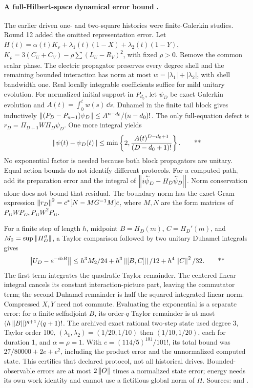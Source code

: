 \paragraph{A full-Hilbert-space dynamical error bound \workstar.}
The earlier driven one- and two-square histories were finite-Galerkin studies.
Round 12 added the omitted representation error.  Let
\(H(t)=\alpha(t)K_\rho+\lambda_1(t)(1-X)+\lambda_2(t)(1-Y)\),
\(K_\rho=3(C_U+C_V)-\rho\sum(L_U-R_V)^2\), with fixed \(\rho>0\).
Remove the common scalar phase.  The electric propagator preserves every
degree shell and the remaining bounded interaction has norm at most
\(w=|\lambda_1|+|\lambda_2|\), with shell bandwidth one.  Real locally
integrable coefficients suffice for mild unitary evolution.
For normalized initial support in \(P_{d_0}\), let \(\psi_D\) be exact
Galerkin evolution and \(A(t)=\int_0^tw(s)\,\dd s\).  Duhamel in the finite
tail block gives inductively
\(\left\lVert (P_D-P_{n-1})\psi_D\right\rVert\le A^{n-d_0}/(n-d_0)!\).
The only full-equation defect is
\(r_D=\Pi_{D+1}W\Pi_D\psi_D\).  One more integral yields
\begin{equation}
 \left\lVert \psi(t)-\psi_D(t)\right\rVert\le
 \min\left\{2,\frac{A(t)^{D-d_0+1}}{(D-d_0+1)!}\right\}.
 \qquad\text{**}\label{early:factorial}
\end{equation}
No exponential factor is needed because both block propagators are unitary.
Equal action bounds do not identify different protocols.  For a computed
path, add its preparation error and the integral of
\(\left\lVert i\dot{\widetilde\psi}_D-H_D\widetilde\psi_D\right\rVert\).
Norm conservation alone does not bound that residual.  The boundary norm
has the exact Gram expression
\(\left\lVert r_D\right\rVert^2=c^*[N-MG^{-1}M]c\), where \(M,N\) are the form matrices of
\(P_DWP_D,P_DW^2P_D\).

For a finite step of length \(h\), midpoint \(B=H_D(m)\),
\(C=H_D'(m)\), and \(M_2=\sup\left\lVert H_D''\right\rVert\), a Taylor comparison followed
by two unitary Duhamel integrals gives
\begin{equation}
 \left\lVert U_D-e^{-ihB}\right\rVert\le h^3M_2/24+h^3\left\lVert [B,C]\right\rVert/12
 +h^4\left\lVert C\right\rVert^2/32.
 \qquad\text{**}\label{early:midpoint}
\end{equation}
The first term integrates the quadratic Taylor remainder.  The centered
linear integral cancels its constant interaction-picture part, leaving the
commutator term; the second Duhamel remainder is half the squared integrated
linear norm.  Compressed \(X,Y\) need not commute.  Evaluating the exponential
is a separate error: for a finite selfadjoint \(B\), its order-\(q\) Taylor
remainder is at most \((h\left\lVert B\right\rVert)^{q+1}/(q+1)!\).
The archived exact rational two-step state used degree 3, Taylor order 100,
\((\lambda_1,\lambda_2)=(1/20,1/10)\) then \((1/10,1/20)\), each for
duration 1, and \(\alpha=\rho=1\).  With
\(e=(114/5)^{101}/101!\), its total bound was
\(27/80000+2e+e^2\), including the product error and the unnormalized
computed state.  This certifies that declared protocol, not all historical
drives.  Bounded-observable errors are at most \(2\left\lVert O\right\rVert\) times a normalized
state error; energy needs its own work identity and cannot use a fictitious
global norm of \(H\).  Sources:  and
.

